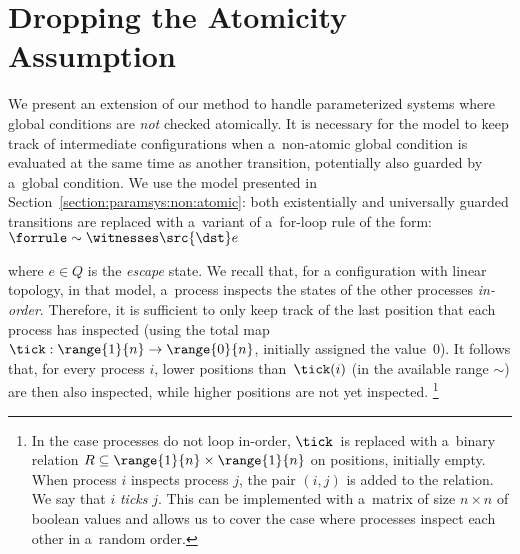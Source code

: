 \section[No Atomicity]{Dropping the Atomicity Assumption}
\label{section:view:non:atomic}

%
We present an extension of our method to handle parameterized systems
where global conditions are \emph{not} checked atomically.
%
It is necessary for the model to keep track of intermediate
configurations when a~non-atomic global condition is evaluated at the
same time as another transition, potentially also guarded by a~global
condition.
%
We use the model presented in
Section~\ref{section:paramsys:non:atomic}: %
both existentially and universally guarded transitions are replaced
with a~variant of a~for-loop rule of the form:
%
\hfill%
$\forrule \sim \witnesses \src {\dst} e$

\noindent%
where $e\in Q$ is the \emph{escape} state.
%
We recall that, for a configuration with linear topology, in that
model, a~process inspects the states of the other processes
\emph{in-order}.
%
Therefore, it is sufficient to only keep track of the last position
that each process has inspected (using the total map
$\tick:\range{1}{n}\rightarrow\range{0}{n}$, initially assigned the
value~$0$). It follows that, for every process $i$, lower positions
than~$\tick(i)$ (in the available range $\sim$) are then also
inspected, while higher positions are not yet inspected.%
\footnote{%
  In the case processes do not loop in-order, $\tick$~is replaced with
  a~binary relation $R\subseteq\range{1}{n}\times\range{1}{n}$ on
  positions, initially empty. When process $i$ inspects process $j$,
  the pair $(i,j)$ is added to the relation. We say that $i$
  \emph{ticks} $j$. This can be implemented with a~matrix of size
  $n{\times}n$ of boolean values and allows us to cover the case where
  processes inspect each other in a~random order.
}%

